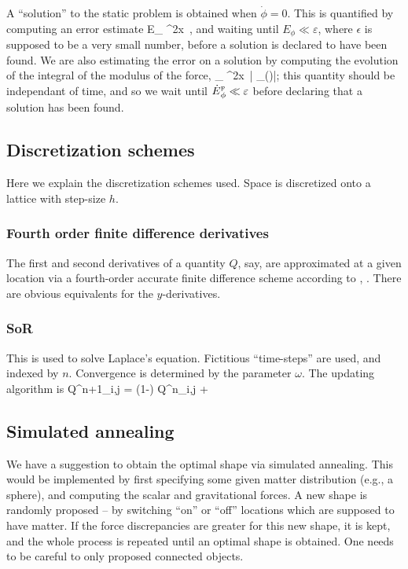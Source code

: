 \documentclass[a4paper, 12pt]{article}
\numberwithin{equation}{section}
\begin{document}
A ``solution'' to the static problem is obtained when $\dot{\phi}=0$. This is quantified by computing an error estimate
\bea
E_{\phi}  \int \dd^2x\, \dot{\phi},
\eea
and waiting until $E_{\phi}\ll \varepsilon$, where $\epsilon$ is supposed to be a very small number, before a solution is declared to have been found. We are also estimating the error on a solution by computing the evolution of the integral of the modulus of the force,
\bea
{}_{\phi}  \int \dd^2x\, \left| _{(\phi)}\right|;
\eea
this quantity should be independant of time, and so we wait until $\dot{E}{}^{\scriptscriptstyle{\textrm{F}}}_{\phi}\ll \varepsilon$ before declaring that a solution has been found.



\subsection{Discretization schemes}
Here we explain the discretization schemes used. Space is discretized onto a lattice with step-size $h$.

\subsubsection{Fourth order finite difference derivatives}
The first and second derivatives of a quantity $Q$, say, are approximated at a given location via a fourth-order accurate finite difference scheme according to
\bea
{} \approx {},
\eea
\bea
{} \approx {}.
\eea
There are obvious equivalents for the $y$-derivatives.

\subsubsection{SoR} 
This is used to solve Laplace's equation. Fictitious ``time-steps'' are used, and indexed by $n$. Convergence is determined by the parameter $\omega$. The updating algorithm is
\bea
Q^{n+1}_{i,j} = (1-\omega) Q^{n}_{i,j} + 
\eea

\subsection{Simulated annealing}
We have a suggestion to obtain the optimal shape via simulated annealing. This would be implemented by first specifying some given matter distribution (e.g., a sphere), and computing the scalar and gravitational forces. A new shape is randomly proposed -- by switching ``on'' or ``off'' locations which are supposed to have matter. If the force discrepancies are greater for this new shape, it is kept, and the whole process is repeated until an optimal shape is obtained. One needs to be careful to only proposed connected objects.
\end{document}
